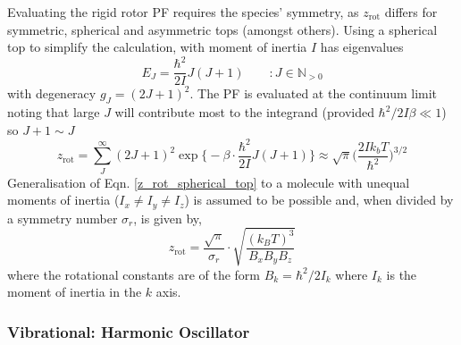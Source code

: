 \documentclass[../main.tex]{subfiles}
\begin{document}
Evaluating the rigid rotor PF requires the species' symmetry, as $z_\text{rot}$ differs for symmetric, spherical and asymmetric tops (amongst others). Using a spherical top to simplify the calculation, with moment of inertia  $I$ has eigenvalues 
\begin{equation}
E_J = \frac{\hbar^2}{2I} J(J+1) \qquad: J \in \mathbb{N}_{>0}
\end{equation}
with degeneracy $g_J = (2J + 1)^2$. The PF is evaluated at the continuum limit noting that large $J$ will contribute most to the integrand (provided $\hbar^2/2I\beta \ll 1$) so $J + 1 \sim J$
\begin{equation}
z_\text{rot} = \sum_{J}^\infty (2J + 1)^2\exp{ {\Big \{} -{\beta}\cdot  \frac{\hbar^2}{2I}J(J+1)}{\Big \}} \approx \sqrt{\pi} {\Big (} \frac{2I k_b T}{\hbar^2} {\Big )}^{3/2}
\label{z_rot_spherical_top}
\end{equation}
Generalisation of Eqn. \eqref{z_rot_spherical_top} to a molecule with unequal moments of inertia ($I_x \neq I_y \neq I_z$) is assumed to be possible and, when divided by a symmetry number $\sigma_r$, is given by,
\begin{equation}
z_\text{rot} = \frac{\sqrt{\pi}}{\sigma_r} \cdot \sqrt{\frac{ (k_B T)^3}{B_x B_y B_z}}
\end{equation}
where the rotational constants are of the form $B_k = \hbar^2/2 I_k $ where $I_k$ is the moment of inertia in the $k$ axis.




\subsubsection{Vibrational: Harmonic Oscillator}
\end{document}
